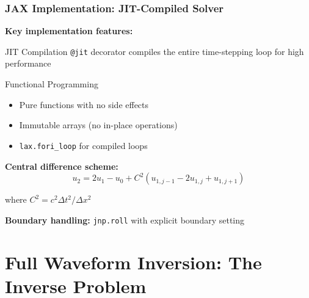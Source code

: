 \documentclass[notes]{beamer}
\begin{document}
\begin{frame}
\frametitle{JAX Implementation: JIT-Compiled Solver}

\textbf{Key implementation features:}

\begin{block}{JIT Compilation}
\texttt{@jit} decorator compiles the entire time-stepping loop for high performance
\end{block}

\begin{block}{Functional Programming}
\begin{itemize}
    \item Pure functions with no side effects
    \item Immutable arrays (no in-place operations)
    \item \texttt{lax.fori\_loop} for compiled loops
\end{itemize}
\end{block}

\textbf{Central difference scheme:}
\begin{equation*}
u_2 = 2u_1 - u_0 + C^2(u_{1,j-1} - 2u_{1,j} + u_{1,j+1})
\end{equation*}

where $C^2 = c^2\Delta t^2/\Delta x^2$

\textbf{Boundary handling:} \texttt{jnp.roll} with explicit boundary setting

\end{frame}

\section{Full Waveform Inversion: The Inverse Problem}
\end{document}
